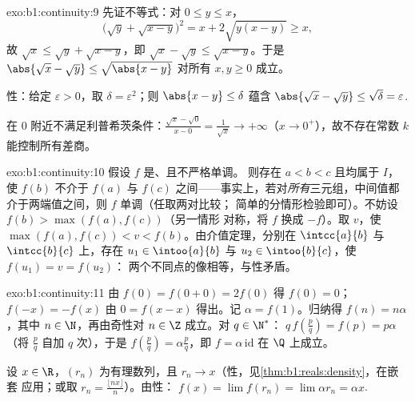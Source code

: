 \begin{solution}{exo:b1:continuity:9}
先证不等式：对 $0 \leq y \leq x$，
\[
\bigl(\sqrt y + \sqrt{x - y}\bigr)^2 = x + 2\sqrt{y(x-y)} \geq x,
\]
故 $\sqrt x \leq \sqrt y + \sqrt{x - y}$，即 $\sqrt x - \sqrt y
\leq \sqrt{x - y}$。于是 $\abs{\sqrt x - \sqrt y} \leq
\sqrt{\abs{x - y}}$ 对所有 $x, y \geq 0$ 成立。

性：给定 $\varepsilon > 0$，取 $\delta =
\varepsilon^2$；则 $\abs{x - y} \leq \delta$ 蕴含 $\abs{\sqrt x
- \sqrt y} \leq \sqrt\delta = \varepsilon$.

在 $0$ 附近不满足利普希茨条件：$\frac{\sqrt x - \sqrt 0}{x - 0} =
\frac{1}{\sqrt x} \to +\infty$（$x \to 0^+$），故不存在常数 $k$
能控制所有差商。
\end{solution}

\begin{solution}{exo:b1:continuity:10}
假设 $f$ 是、且不严格单调。
则存在 $a < b < c$ 且均属于 $I$，使 $f(b)$ 不介于 $f(a)$ 与
$f(c)$ 之间——事实上，若对\emph{所有}三元组，中间值都
介于两端值之间，则 $f$ 单调（任取两对比较；
简单的分情形检验即可）。不妨设 $f(b) > \max(f(a), f(c))$（另一情形
对称，将 $f$ 换成 $-f$）。取 $v$，使 $\max(f(a),
f(c)) < v < f(b)$。由介值定理，分别在
$\intcc{a}{b}$ 与 $\intcc{b}{c}$ 上，存在 $u_1 \in
\intoo{a}{b}$ 与 $u_2 \in \intoo{b}{c}$，使 $f(u_1) = v = f(u_2)$：
两个不同点的像相等，与性矛盾。
\end{solution}

\begin{solution}{exo:b1:continuity:11}
由 $f(0) = f(0+0) = 2f(0)$ 得 $f(0) = 0$；$f(-x) = -f(x)$ 由 $0 =
f(x - x)$ 得出。记 $\alpha = f(1)$。归纳得 $f(n) = n\alpha$，其中 $n
\in \N$，再由奇性对 $n \in \Z$ 成立。对 $q \in \N^*$：
$q\,f(\frac pq) = f(p) = p\alpha$（将 $\frac pq$ 自加 $q$
次），于是 $f(\frac pq) = \alpha\frac pq$，即 $f = \alpha\,
\mathrm{id}$ 在 $\Q$ 上成立。

设 $x \in \R$，$(r_n)$ 为有理数列，且 $r_n \to
x$（性，见\cref{thm:b1:reals:density}，在嵌套
应用；或取 $r_n = \frac{\lfloor nx\rfloor}{n}$）。由性：
$f(x) = \lim f(r_n) = \lim \alpha r_n = \alpha x$.
\end{solution}

